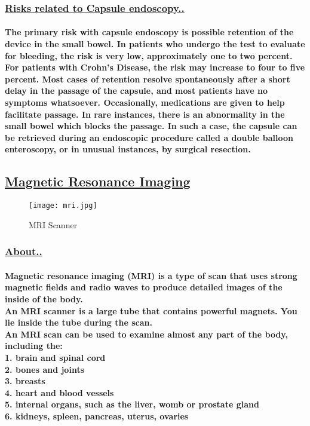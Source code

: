 \documentclass[12pt]{article}
\begin{document}
        \subsubsection{\underline{Risks related to Capsule endoscopy..}}
        \paragraph{The primary risk with capsule endoscopy is possible retention of the device in the small bowel. In patients who undergo the test to evaluate for bleeding, the risk is very low, approximately one to two percent. For patients with \textbf{Crohn's Diseas}e, the risk may increase to four to five percent.  Most cases of retention resolve spontaneously after a short delay in the passage of the capsule, and most patients have no symptoms whatsoever. Occasionally, medications are given to help facilitate passage. In rare instances, there is an abnormality in the small bowel which blocks the passage. In such a case, the capsule can be retrieved during an endoscopic procedure called a \textbf{double balloon enteroscopy}, or in unusual instances, by surgical resection.
        }
         
    \clearpage
    \subsection{\underline{Magnetic Resonance Imaging}}
        \begin{figure}[h]
       	\texttt{[image: mri.jpg]}
       	\caption{MRI Scanner}
       \end{figure}
     \subsubsection{\underline{About..}}
    \paragraph{Magnetic resonance imaging (MRI) is a type of scan that uses strong magnetic fields and radio waves to produce detailed images of the inside of the body.\\An MRI scanner is a large tube that contains powerful magnets. You lie inside the tube during the scan.\\An MRI scan can be used to examine almost any part of the body, including the:
    	\\\textbf{1.} brain and spinal cord
    	\\\textbf{2.} bones and joints
    	\\\textbf{3.} breasts
    	\\\textbf{4.} heart and blood vessels
    	\\\textbf{5.} internal organs, such as the liver, womb or prostate gland
        \\\textbf{6.} kidneys, spleen, pancreas, uterus, ovaries}
\end{document}
